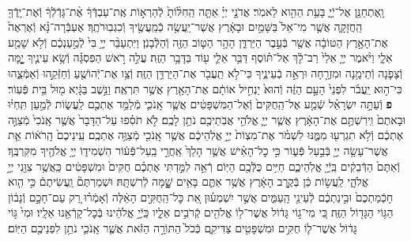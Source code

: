 \documentclass[twoside, openany, parskip=half, 11pt]{book}
\begin{document}
\begin{footnotesize}
\begin{multicols}{2}
\\
וָֽאֶתְחַנַּ֖ן אֶל־יְֿיָ֑ בָּעֵ֥ת הַהִ֖וא לֵאמֹֽר׃ אֲדֹנָ֣י יְיָ֗ אַתָּ֤ה הַֽחִלּ֨וֹתָ֙ לְֿהַרְא֣וֹת אֶֽת־עַבְדְּֿךָ֔ אֶ֨ת־גָּדְֿלְֿךָ֔ וְֿאֶת־יָֽדְֿךָ֖ הַֽחֲזָקָ֑ה אֲשֶׁ֤ר מִי־אֵל֙ בַּשָּׁמַ֣יִם וּבָאָ֔רֶץ אֲשֶׁר־יַֽעֲשֶׂ֥ה כְֿמַֽעֲשֶׂ֖יךָ וְֿכִגְבֽוּרֹתֶֽךָ׃ אֶעְבְּֿרָה־נָּ֗א וְֿאֶרְאֶה֙ אֶת־הָאָ֣רֶץ הַטּוֹבָ֔ה אֲשֶׁ֖ר בְּֿעֵ֣בֶר הַיַּרְדֵּ֑ן הָהָ֥ר הַטּ֛וֹב הַזֶּ֖ה וְֿהַלְּֿבָנֹֽן׃  וַיִּתְעַבֵּ֨ר יְיָ֥ בִּי֙ לְֿמַ֣עַנְכֶ֔ם וְֿלֹ֥א שָׁמַ֖ע אֵלָ֑י וַיֹּ֨אמֶר יְיָ֤ אֵלַי֙ רַב־לָ֔ךְ אַל־תּ֗וֹסֶף דַּבֵּ֥ר אֵלַ֛י ע֖וֹד בַּדָּבָ֥ר הַזֶּֽה׃ עֲלֵ֣ה רֹ֣אשׁ הַפִּסְגָּ֗ה וְֿשָׂ֥א עֵינֶ֛יךָ יׇׇׇָ֧מָּה וְֿצָפֹ֛נָה וְֿתֵימָ֥נָה וּמִזְרָ֖חָה וּרְאֵ֣ה בְֿעֵינֶ֑יךָ כִּי־לֹ֥א תַֽעֲבֹ֖ר אֶת־הַיַּרְדֵּ֥ן הַזֶּֽה׃ וְֿצַ֥ו אֶת־יְֿהוֹשֻׁ֖עַ וְֿחַזְּֿקֵ֣הוּ וְֿאַמְּֿצֵ֑הוּ כִּי־ה֣וּא יַֽעֲבֹ֗ר לִפְנֵי֙ הָעָ֣ם הַזֶּ֔ה וְֿהוּא֙ יַנְחִ֣יל אוֹתָ֔ם אֶת־הָאָ֖רֶץ אֲשֶׁ֥ר תִּרְאֶֽה׃ וַנֵּ֣שֶׁב בַּגָּ֔יְא מ֖וּל בֵּ֥ית פְּֿעֽוֹר׃ \textbf{פ}
וְֿעַתָּ֣ה יִשְׂרָאֵ֗ל שְֿׁמַ֤ע אֶל־הַֽחֻקִּים֙ וְֿאֶל־הַמִּשְׁפָּטִ֔ים אֲשֶׁ֧ר אָֽנֹכִ֛י מְֿלַמֵּ֥ד אֶתְכֶ֖ם לַֽעֲשׂ֑וֹת לְֿמַ֣עַן תִּֽחְי֗וּ וּבָאתֶם֙ וִֽירִשְׁתֶּ֣ם אֶת־הָאָ֔רֶץ אֲשֶׁ֧ר יְיָ֛ אֱלֹהֵ֥י אֲבֹֽתֵיכֶ֖ם נֹתֵ֥ן לָכֶֽם׃ לֹ֣א תֹסִ֗פוּ עַל־הַדָּבָר֙ אֲשֶׁ֤ר אָֽנֹכִי֙ מְֿצַוֶּ֣ה אֶתְכֶ֔ם וְֿלֹ֥א תִגְרְע֖וּ מִמֶּ֑נּוּ לִשְׁמֹ֗ר אֶת־מִצְוֹת֙ יְיָ֣ אֱלֹֽהֵיכֶ֔ם אֲשֶׁ֥ר אָֽנֹכִ֖י מְֿצַוֶּ֥ה אֶתְכֶֽם׃ עֵֽינֵיכֶם֙ הָֽרֹא֔וֹת אֵ֛ת אֲשֶׁר־עָשָׂ֥ה יְיָ֖ בְּֿבַ֣עַל פְּֿע֑וֹר כִּ֣י כׇל־הָאִ֗ישׁ אֲשֶׁ֤ר הָלַךְ֙ אַֽחֲרֵ֣י בַֽעַל־פְּֿע֔וֹר הִשְׁמִיד֛וֹ יְיָ֥ אֱלֹהֶ֖יךָ מִקִּרְבֶּֽךָ׃ וְֿאַתֶּם֙ הַדְּֿבֵקִ֔ים בַּֽיְֿיָ֖ אֱלֹֽהֵיכֶ֑ם חַיִּ֥ים כֻּלְּֿכֶ֖ם הַיּֽוֹם׃  רְֿאֵ֣ה לִמַּ֣דְתִּי אֶתְכֶ֗ם חֻקִּים֙ וּמִשְׁפָּטִ֔ים כַּֽאֲשֶׁ֥ר צִוַּ֖נִי יְיָ֣ אֱלֹהָ֑י לַֽעֲשׂ֣וֹת כֵּ֔ן בְּֿקֶ֣רֶב הָאָ֔רֶץ אֲשֶׁ֥ר אַתֶּ֛ם בָּאִ֥ים שׇׇׇָׁ֖מָּה לְֿרִשְׁתָּֽהּ׃ וּשְׁמַרְתֶּם֘ וַֽעֲשִׂיתֶם֒ כִּ֣י הִ֤וא חָכְֿמַתְכֶם֙ וּבִ֣ינַתְכֶ֔ם לְֿעֵינֵ֖י הָֽעַמִּ֑ים אֲשֶׁ֣ר יִשְׁמְע֗וּן אֵ֚ת כׇּל־הַֽחֻקִּ֣ים הָאֵ֔לֶּה וְֿאָמְֿר֗וּ רַ֚ק עַם־חָכָ֣ם וְֿנָב֔וֹן הַגּ֥וֹי הַגָּד֖וֹל הַזֶּֽה׃ כִּ֚י מִי־ג֣וֹי גָּד֔וֹל אֲשֶׁר־ל֥וֹ אֱלֹהִ֖ים קְֿרֹבִ֣ים אֵלָ֑יו כַּֽיְֿיָ֣ אֱלֹהֵ֔ינוּ בְּֿכׇל־קָרְֿאֵ֖נוּ אֵלָֽיו׃ וּמִי֙ גּ֣וֹי גָּד֔וֹל אֲשֶׁר־ל֛וֹ חֻקִּ֥ים וּמִשְׁפָּטִ֖ים צַדִּיקִ֑ם כְּֿכֹל֙ הַתּוֹרָ֣ה הַזֹּ֔את אֲשֶׁ֧ר אָֽנֹכִ֛י נֹתֵ֥ן לִפְנֵיכֶ֖ם הַיּֽוֹם׃


\end{multicols}
\end{footnotesize}
\end{document}
